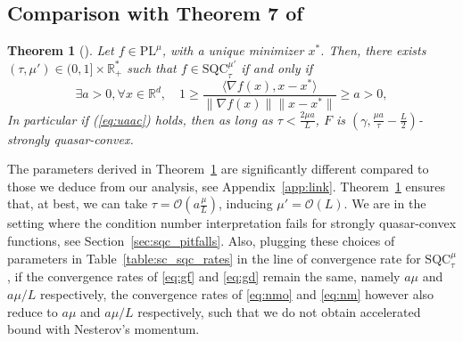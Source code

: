 \documentclass{article}
\def\pl{{\text{PL}^\mu}}
\newcommand{\sqc}{\text{SQC}_{\tau}^{\mu}}
\newcommand{\sqcf}[2]{\text{SQC}_{#1}^{#2}}
\newcommand{\bigO}{\mathcal{O}}
\theoremstyle{plain}
\newtheorem{theorem}{Theorem}[section]
\theoremstyle{definition}
\theoremstyle{remark}
\begin{document}
\subsection{Comparison with Theorem 7 of \cite{hermant2024study}}\label{app:related:uaac}
\begin{theorem}[\cite{hermant2024study}]\label{thm:uaac}
    Let $f \in \pl$, with a unique minimizer $x^\ast$. Then, there exists $(\tau,\mu') \in (0,1] \times \mathbb{R}^\ast_+$ such that $f\in \sqcf{\tau}{\mu'}$ if and only if
          \begin{equation}\label{eq:uaac}
                          \exists a > 0,  \forall x \in \mathbb{R}^d, \quad 1 \geqslant \frac{\langle \nabla f(x),x - x^\ast \rangle}{\lVert  \nabla f(x) \rVert \lVert x - x^\ast \rVert} \geqslant a> 0,
          \end{equation}
  In particular if (\ref{eq:uaac}) holds, then as long as $\tau < \frac{2 \mu a}{L}$, $F$ is $(\gamma, \frac{\mu a}{\tau} - \frac{L}{2})$-strongly quasar-convex.
\end{theorem}
 The parameters derived in Theorem~\ref{thm:uaac} are significantly different compared to those we deduce from our analysis, see Appendix~\ref{app:link}. Theorem~\ref{thm:uaac} ensures that, at best, we can take $\tau = \bigO(a\frac{\mu}{L})$, inducing $\mu' = \bigO(L)$. We are in the setting where the condition number interpretation fails for strongly quasar-convex functions, see Section~\ref{sec:sqc_pitfalls}. Also, plugging these choices of parameters in Table~\ref{table:sc_sqc_rates} in the line of convergence rate for $\sqc$, if the convergence rates of \eqref{eq:gf} and \eqref{eq:gd} remain the same, namely $a \mu$ and $a \mu /L$ respectively, the convergence rates of \eqref{eq:nmo} and \eqref{eq:nm} however also reduce to $a \mu$ and $a \mu /L$ respectively, such that we do not obtain accelerated bound with Nesterov's momentum.
\end{document}
